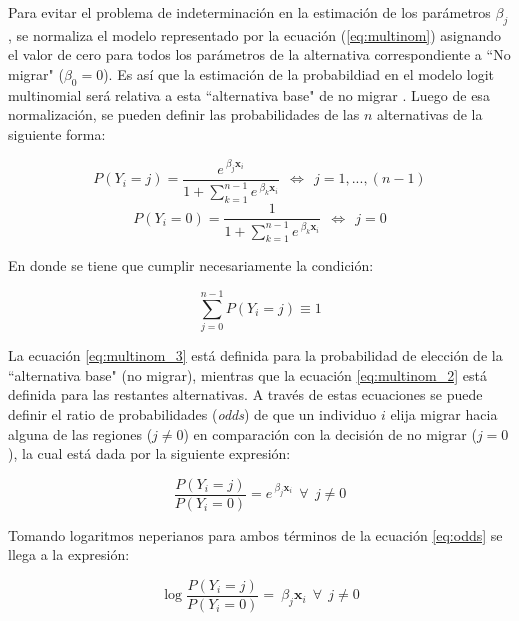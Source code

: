 \documentclass[12pt,a4paper]{article}
\begin{document}
Para evitar el problema de indeterminación en la estimación de los parámetros $\beta_{j}$, se normaliza el modelo representado por la ecuación (\ref{eq:multinom}) asignando el valor de cero para todos los parámetros de la alternativa correspondiente a ``No migrar" ($\beta_{0}=0$). Es así que la estimación de la probabildiad en el modelo logit multinomial será relativa a esta ``alternativa base"  de no migrar \parencite{coxhead_migration_2015}.
Luego de esa normalización, se pueden definir las probabilidades de las $n$ alternativas de la siguiente forma:
\begin {center}
\begin{equation}\label{eq:multinom_2}
P{(Y_{i}=j)}=\frac{e^{\ \beta_{j} \textbf{x}_{i}}}{1+\sum_{k=1}^{n-1}e^{\ \beta_{k} \textbf{x}_{i}}} \ \ \Leftrightarrow \ \ j=1,...,(n-1)
\end{equation}
\begin{equation}\label{eq:multinom_3}
P{(Y_{i}=0)}=\frac{1}{1+\sum_{k=1}^{n-1}e^{\ \beta_{k} \textbf{x}_{i}}} \ \ \Leftrightarrow \ \ j=0
\end{equation}
\end {center}

En donde se tiene que cumplir necesariamente la condición:
\begin {center}
\begin{equation}\label{eq:multinom_4}
\sum_{j=0}^{n-1}P{(Y_{i}=j)}\equiv1
\end{equation}
\end {center}

La ecuación \ref{eq:multinom_3} está definida para la probabilidad de elección de la ``alternativa base" (no migrar), mientras que la ecuación \ref{eq:multinom_2} está definida para las restantes alternativas. A través de estas ecuaciones se puede definir el ratio de probabilidades (\textit{odds}) de que un individuo $i$ elija migrar hacia alguna de las regiones ($j\neq0$) en comparación con la decisión de no migrar ($j=0$), la cual está dada por la siguiente expresión:
\begin{center}
\begin{equation}\label{eq:odds}
\frac{P{(Y_{i}=j)}}{P{(Y_{i}=0)}}=e^{\ \beta_{j} \textbf{x}_{i}} \ \ \forall \ \ j\neq0
\end{equation}
\end {center}
Tomando logaritmos neperianos para ambos términos de la ecuación \ref{eq:odds} se llega a la expresión:
\begin{center}
\begin{equation}\label{eq:logodds}
\log\frac{P{(Y_{i}=j)}}{P{(Y_{i}=0)}}=\ \beta_{j} \textbf{x}_{i} \ \ \forall \ \ j\neq0
\end{equation}
\end {center}
\end{document}
